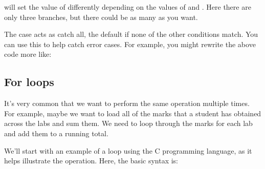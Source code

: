 \documentclass[letterpaper,10pt,british]{sphinxmanual}
\begin{document}
\sphinxAtStartPar
will set the value of  differently depending on the values of  and . Here there are only three branches, but there could be as many as you want.

\sphinxAtStartPar
The  case acts as catch all, the default if none of the other conditions match. You can use this to help catch error cases. For example, you might re\sphinxhyphen{}write the above code more like:

\begin{sphinxVerbatim}[commandchars=\\\{\}]
  
  
   
      
   
      
   
      
     
\end{sphinxVerbatim}


\subsection{For loops}
\label{\detokenize{chapters/programming_fundamentals/conditionals_and_loops:for-loops}}\label{\detokenize{chapters/programming_fundamentals/conditionals_and_loops:id1}}
\sphinxAtStartPar
It’s very common that we want to perform the same operation multiple times. For example, maybe we want to load all of the marks that a student has obtained across the labs and sum them. We need to loop through the marks for each lab and add them to a running total.

\sphinxAtStartPar
We’ll start with an example of a loop using the C programming language, as it helps illustrate the operation. Here, the basic syntax is:

\begin{sphinxVerbatim}[commandchars=\\\{\}]
\end{sphinxVerbatim}
\end{document}
